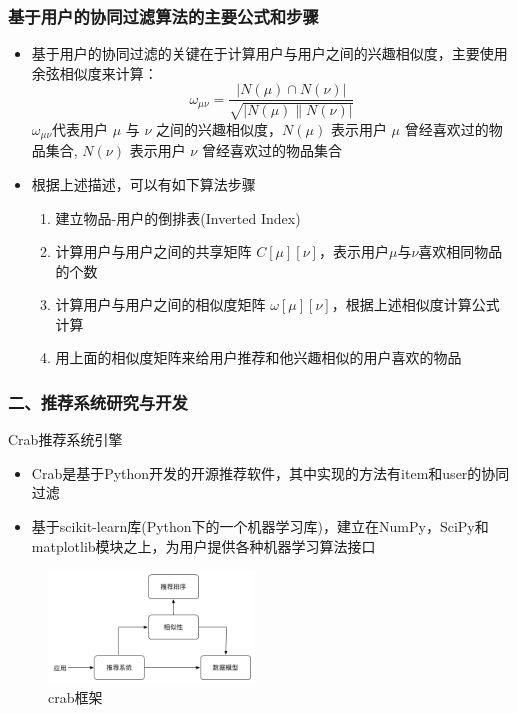 \documentclass{beamer}
\begin{document}
\begin{frame}
\frametitle{基于用户的协同过滤算法的主要公式和步骤}
  \begin{itemize}
    \item \cite{crab3} 基于用户的协同过滤的关键在于计算用户与用户之间的兴趣相似度，主要使用余弦相似度来计算：\\
    \begin{displaymath}
    \omega_{\mu\nu} = \frac{|N(\mu) \cap N(\nu)|}{\sqrt{|N(\mu) \parallel N(\nu)|}}
    \end{displaymath}
    $\omega_{\mu\nu}$代表用户 $\mu$ 与 $ \nu $ 之间的兴趣相似度，$ {N(\mu)} $ 表示用户 $ \mu $ 曾经喜欢过的物品集合, $ {N(\nu)} $ 表示用户 $ \nu $ 曾经喜欢过的物品集合
    \item 根据上述描述，可以有如下算法步骤
      \begin{enumerate}
        \item 建立物品-用户的倒排表(Inverted Index)
        \item 计算用户与用户之间的共享矩阵 $C[\mu][\nu]$，表示用户$\mu$与$\nu$喜欢相同物品的个数
        \item 计算用户与用户之间的相似度矩阵 $\omega[\mu][\nu]$，根据上述相似度计算公式计算
        \item 用上面的相似度矩阵来给用户推荐和他兴趣相似的用户喜欢的物品
      \end{enumerate}
  \end{itemize}
\end{frame}

\begin{frame}
\frametitle{二、推荐系统研究与开发}
  \begin{block}{Crab推荐系统引擎}
    \begin{itemize}
      \item Crab是基于Python开发的开源推荐软件，其中实现的方法有item和user的协同过滤
      \item 基于scikit-learn库(Python下的一个机器学习库)，建立在NumPy，SciPy和matplotlib模块之上，为用户提供各种机器学习算法接口
    \end{itemize}
  \end{block}
  \begin{figure}
    \centering
      \includegraphics[height=3cm]{./img/crab.png}
    \caption{crab框架}
    \label{fig:visual}
  \end{figure}
\end{frame}
\end{document}
